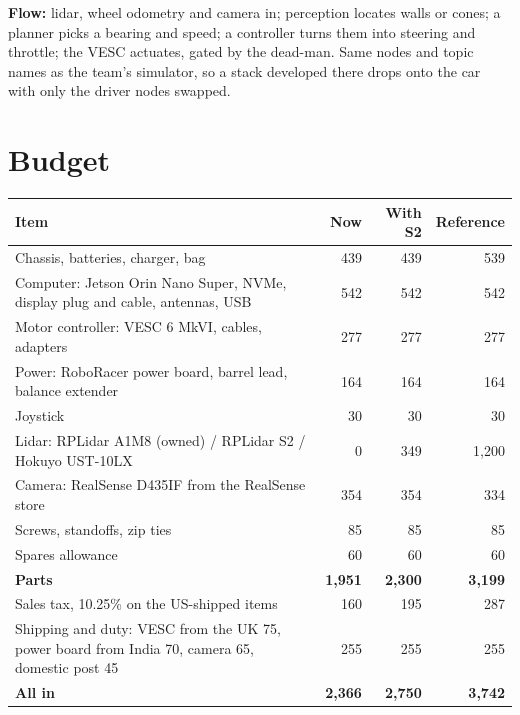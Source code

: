 \documentclass[11pt,a4paper]{article}
\begin{document}
\smallskip
\textbf{Flow:} lidar, wheel odometry and camera in; perception locates walls or cones; a
planner picks a bearing and speed; a controller turns them into steering and throttle; the
VESC actuates, gated by the dead-man. Same nodes and topic names as the team's simulator, so
a stack developed there drops onto the car with only the driver nodes swapped.

\section{Budget}

\begin{tabularx}{\linewidth}{Xrrr}
\toprule
Item & Now & With S2 & Reference \\
\midrule
Chassis, batteries, charger, bag & 439 & 439 & 539 \\
Computer: Jetson Orin Nano Super, NVMe, display plug and cable, antennas, USB & 542 & 542 & 542 \\
Motor controller: VESC 6 MkVI, cables, adapters & 277 & 277 & 277 \\
Power: RoboRacer power board, barrel lead, balance extender & 164 & 164 & 164 \\
Joystick & 30 & 30 & 30 \\
Lidar: RPLidar A1M8 (owned) / RPLidar S2 / Hokuyo UST-10LX & 0 & 349 & 1{,}200 \\
Camera: RealSense D435IF from the RealSense store & 354 & 354 & 334 \\
Screws, standoffs, zip ties & 85 & 85 & 85 \\
Spares allowance & 60 & 60 & 60 \\
\midrule
\textbf{Parts} & \textbf{1{,}951} & \textbf{2{,}300} & \textbf{3{,}199} \\
Sales tax, 10.25\% on the US-shipped items & 160 & 195 & 287 \\
Shipping and duty: VESC from the UK 75, power board from India 70, camera 65, domestic post 45 & 255 & 255 & 255 \\
\midrule
\textbf{All in} & \textbf{2{,}366} & \textbf{2{,}750} & \textbf{3{,}742} \\
\bottomrule
\end{tabularx}
\end{document}
